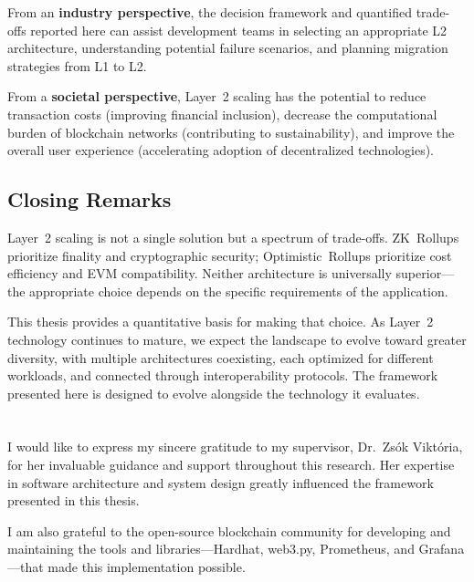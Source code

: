 \documentclass[
]{elteikthesis}[2024/04/26]
\begin{document}
From an \textbf{industry perspective}, the decision framework and quantified trade-offs reported here can assist development teams in selecting an appropriate L2 architecture, understanding potential failure scenarios, and planning migration strategies from L1 to L2.

From a \textbf{societal perspective}, Layer~2 scaling has the potential to reduce transaction costs (improving financial inclusion), decrease the computational burden of blockchain networks (contributing to sustainability), and improve the overall user experience (accelerating adoption of decentralized technologies).

\section{Closing Remarks}

Layer~2 scaling is not a single solution but a spectrum of trade-offs. ZK~Rollups prioritize finality and cryptographic security; Optimistic~Rollups prioritize cost efficiency and EVM compatibility. Neither architecture is universally superior---the appropriate choice depends on the specific requirements of the application.

This thesis provides a quantitative basis for making that choice. As Layer~2 technology continues to mature, we expect the landscape to evolve toward greater diversity, with multiple architectures coexisting, each optimized for different workloads, and connected through interoperability protocols. The framework presented here is designed to evolve alongside the technology it evaluates.

\cleardoublepage

\chapter*{\acklabel}

I would like to express my sincere gratitude to my supervisor, Dr.\ Zsók Viktória, for her invaluable guidance and support throughout this research. Her expertise in software architecture and system design greatly influenced the framework presented in this thesis.

I am also grateful to the open-source blockchain community for developing and maintaining the tools and libraries---Hardhat, web3.py, Prometheus, and Grafana---that made this implementation possible.
\end{document}
